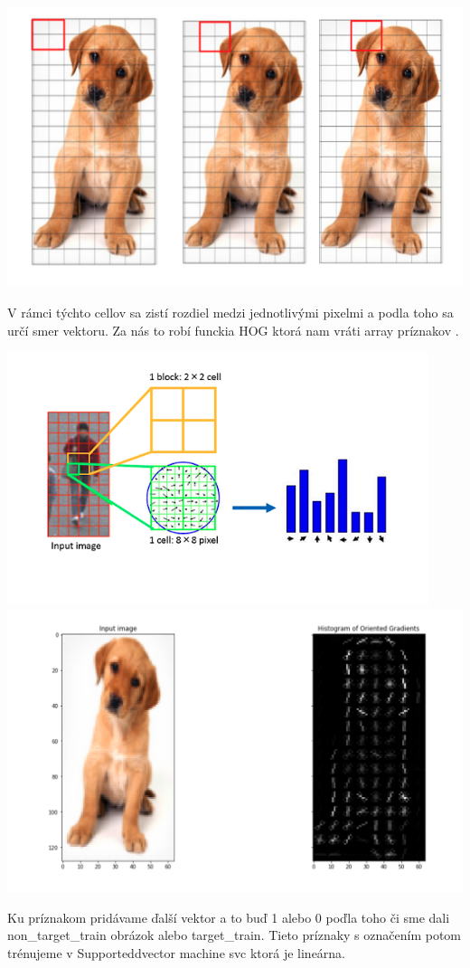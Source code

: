 \documentclass{article}
\begin{document}
    \center\includegraphics[width=0.9\linewidth]{./image2.png}\\
    \begin{flushleft}
    \Large{V rámci týchto cellov   sa zistí rozdiel medzi jednotlivými pixelmi a podla toho sa určí smer vektoru. 
Za nás to robí funckia HOG ktorá nam vráti array príznakov . }
\end{flushleft}

\center\includegraphics[width=0.9\linewidth]{./image3.png}\\
\center\includegraphics[width=0.9\linewidth]{./image1.png}\\
\begin{flushleft}
\Large{Ku príznakom pridávame ďalší vektor a to buď 1 alebo 0 poďla toho či sme dali non\_target\_train obrázok alebo target\_train. Tieto príznaky  s označením potom trénujeme v Supporteddvector machine  svc ktorá je lineárna. }
\end{flushleft}
\end{document}
